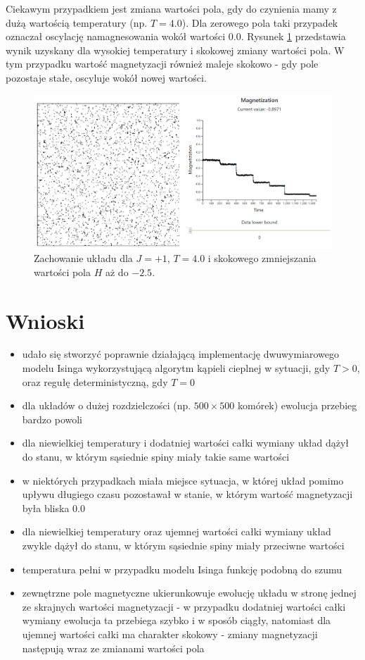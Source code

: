 \documentclass[11pt] {article}
\begin{document}
Ciekawym przypadkiem jest zmiana wartości pola, gdy do czynienia mamy z dużą wartością temperatury (np. $T = 4.0$). Dla zerowego pola taki przypadek oznaczał oscylację namagnesowania wokół wartości $0.0$. Rysunek \ref{fig:HTlarge} przedstawia wynik uzyskany dla wysokiej temperatury i skokowej zmiany wartości pola. W tym przypadku wartość magnetyzacji również maleje skokowo - gdy pole pozostaje stałe, oscyluje wokół nowej wartości.

\begin{figure}[H]
\centering
\includegraphics[width=0.9\linewidth]{res/HnegT4.png}
\caption{Zachowanie układu dla $J = +1$, $T = 4.0$ i skokowego zmniejszania wartości pola $H$ aż do $-2.5$.}
\label{fig:HTlarge}
\end{figure}

\section{Wnioski}
\begin{itemize}
\item udało się stworzyć poprawnie działającą implementację dwuwymiarowego modelu Isinga wykorzystującą algorytm kąpieli cieplnej w sytuacji, gdy $T > 0$, oraz regułę deterministyczną, gdy $T = 0$
\item dla układów o dużej rozdzielczości (np. $500 \times 500$ komórek) ewolucja przebieg bardzo powoli
\item dla niewielkiej temperatury i dodatniej wartości całki wymiany układ dążył do stanu, w którym sąsiednie spiny miały takie same wartości
\item w niektórych przypadkach miała miejsce sytuacja, w której układ pomimo upływu długiego czasu pozostawał w stanie, w którym wartość magnetyzacji była bliska 0.0
\item dla niewielkiej temperatury oraz ujemnej wartości całki wymiany układ zwykle dążył do stanu, w którym sąsiednie spiny miały przeciwne wartości
\item temperatura pełni w przypadku modelu Isinga funkcję podobną do szumu
\item zewnętrzne pole magnetyczne ukierunkowuje ewolucję układu w stronę jednej ze skrajnych wartości magnetyzacji - w przypadku dodatniej wartości całki wymiany ewolucja ta przebiega szybko i w sposób ciągły, natomiast dla ujemnej wartości całki ma charakter skokowy - zmiany magnetyzacji następują wraz ze zmianami wartości pola
\end{itemize}
\end{document}
